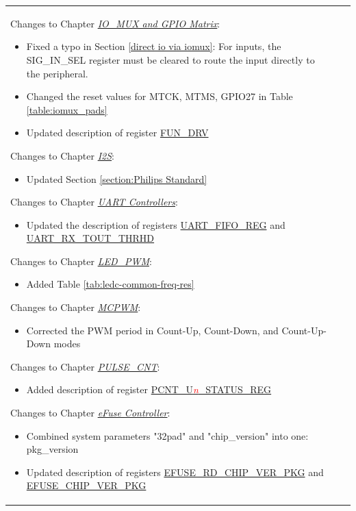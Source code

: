 \begin{longtable}[l]{ | m{2cm} | m{1.5cm} | m{12cm} | }
Changes to Chapter \hyperref[mod:iomuxgpio]{\it{IO\_MUX and GPIO Matrix}}:
\begin{itemize}
\item Fixed a typo in Section \ref{direct io via iomux}: For inputs, the SIG\_IN\_SEL register must be cleared to route the input directly to the peripheral.
\item Changed the reset values for MTCK, MTMS, GPIO27 in Table \ref{table:iomux_pads}
\item Updated description of register \hyperref[FUNDRV]{FUN\_DRV}
\end{itemize}

Changes to Chapter \hyperref[mod:i2s]{\it{I2S}}:
\begin{itemize}
\item Updated Section \ref{section:Philips Standard}
\end{itemize}

Changes to Chapter \hyperref[mod:uart]{\it{UART Controllers}}:
\begin{itemize}
\item Updated the description of registers \hyperref[regdesc:UARTFIFOREG]{UART\_FIFO\_REG} and \hyperref[UARTRXTOUTTHRHD]{UART\_RX\_TOUT\_THRHD}
\end{itemize}

Changes to Chapter \hyperref[mod:ledpwm]{\it{LED\_PWM}}:
\begin{itemize}
\item Added Table \ref{tab:ledc-common-freq-res}
\end{itemize}

Changes to Chapter \hyperref[mod:mcpwm]{\it{MCPWM}}:
\begin{itemize}
\item Corrected the PWM period in Count-Up, Count-Down, and Count-Up-Down modes
\end{itemize}

Changes to Chapter \hyperref[mod:pcnt]{\it{PULSE\_CNT}}:
\begin{itemize}
\item Added description of register \hyperref[regdesc:PCNTUnSTATUSREG]{PCNT\_U\textcolor{red}{\it{n}}\_STATUS\_REG}
\end{itemize}

Changes to Chapter \hyperref[mod:efuse]{\it{eFuse Controller}}:
\begin{itemize}
\item Combined system parameters "32pad" and "chip\_version" into one: pkg\_version
\item Updated description of registers \hyperref[regdesc:EFUSERDCHIPVERPKG]{EFUSE\_RD\_CHIP\_VER\_PKG} and \hyperref[regdesc:EFUSECHIPVERPKG]{EFUSE\_CHIP\_VER\_PKG}
\end{itemize}


\end{longtable}
